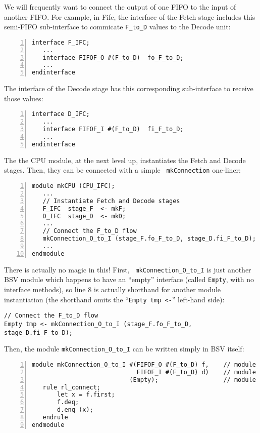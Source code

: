 We will frequently want to connect the output of one FIFO to the input
of another FIFO.  For example, in Fife, the interface of the Fetch
stage includes this semi-FIFO sub-interface to commicate \verb|F_to_D|
values to the Decode unit:

{\small
\begin{Verbatim}[frame=single, numbers=left]
interface F_IFC;
   ...
   interface FIFOF_O #(F_to_D)  fo_F_to_D;
   ...
endinterface
\end{Verbatim}
}

The interface of the Decode stage has this corresponding sub-interface
to receive those values:

{\small
\begin{Verbatim}[frame=single, numbers=left]
interface D_IFC;
   ...
   interface FIFOF_I #(F_to_D)  fi_F_to_D;
   ...
endinterface
\end{Verbatim}
}

The the CPU module, at the next level up, instantiates the Fetch and
Decode stages.  Then, they can be connected with a simple {\tt
mkConnection} one-liner:

{\small
\begin{Verbatim}[frame=single, numbers=left]
module mkCPU (CPU_IFC);
   ...
   // Instantiate Fetch and Decode stages
   F_IFC  stage_F  <- mkF;
   D_IFC  stage_D  <- mkD;
   ...
   // Connect the F_to_D flow
   mkConnection_O_to_I (stage_F.fo_F_to_D, stage_D.fi_F_to_D);
   ...
endmodule
\end{Verbatim}
}

There is actually no magic in this!  First, {\tt
mkConnection\_O\_to\_I} is just another BSV module which happens to
have an ``empty'' interface (called {\tt Empty}, with no interface
methods), so line 8 is actually shorthand for another module
instantiation (the shorthand omits the ``{\tt Empty~tmp~<-}''
left-hand side):

\begin{tabbing}
\hmm\small\tt   // Connect the F\_to\_D flow \\
\hmm\small\tt   Empty tmp <- mkConnection\_O\_to\_I (stage\_F.fo\_F\_to\_D, stage\_D.fi\_F\_to\_D);
\end{tabbing}

Then, the module {\tt mkConnection\_O\_to\_I} can be written simply in BSV itself:

{\small
\begin{Verbatim}[frame=single, numbers=left]
module mkConnection_O_to_I #(FIFOF_O #(F_to_D) f,    // module argument
                             FIFOF_I #(F_to_D) d)    // module argument
                           (Empty);                  // module interface
   rule rl_connect;
       let x = f.first;
       f.deq;
       d.enq (x);
   endrule
endmodule
\end{Verbatim}
}


